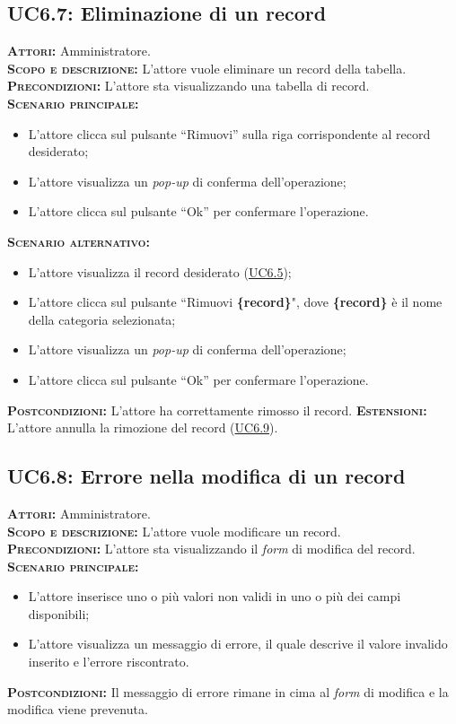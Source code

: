 \subsection{UC6.7: Eliminazione di un record}
\label{sec:UC67}
\textsc{\textbf{Attori:}} Amministratore.\\
\textsc{\textbf{Scopo e descrizione:}} L'attore vuole eliminare un record della tabella.\\
\textsc{\textsc{\textbf{Precondizioni:}}} L'attore sta visualizzando una tabella di record.\\
\textsc{\textbf{Scenario principale:}}
\begin{itemize}
    \item L'attore clicca sul pulsante ``Rimuovi'' sulla riga corrispondente al record desiderato;
    \item L'attore visualizza un \textit{pop-up} di conferma dell'operazione;
    \item L'attore clicca sul pulsante ``Ok'' per confermare l'operazione.
\end{itemize}
\textsc{\textbf{Scenario alternativo:}}
\begin{itemize}
    \item L'attore visualizza il record desiderato (\hyperref[sec:UC65]{UC6.5});
    \item L'attore clicca sul pulsante ``Rimuovi \textbf{\{record\}}", dove \textbf{\{record\}} è il nome della categoria selezionata;
    \item L'attore visualizza un \textit{pop-up} di conferma dell'operazione;
    \item L'attore clicca sul pulsante ``Ok'' per confermare l'operazione.
\end{itemize}
\textsc{\textbf{Postcondizioni:}} L'attore ha correttamente rimosso il record.
\textsc{\textbf{Estensioni:}} L'attore annulla la rimozione del record (\hyperref[sec:UC69]{UC6.9}).

\subsection{UC6.8: Errore nella modifica di un record}
\label{sec:UC68}
\textsc{\textbf{Attori:}} Amministratore.\\
\textsc{\textbf{Scopo e descrizione:}} L'attore vuole modificare un record.\\
\textsc{\textsc{\textbf{Precondizioni:}}} L'attore sta visualizzando il \textit{form} di modifica del record.\\
\textsc{\textbf{Scenario principale:}} 
\begin{itemize}
    \item L'attore inserisce uno o più valori non validi in uno o più dei campi disponibili;
    \item L'attore visualizza un messaggio di errore, il quale descrive il valore invalido inserito e l'errore riscontrato.
\end{itemize}
\textsc{\textbf{Postcondizioni:}} Il messaggio di errore rimane in cima al \textit{form} di modifica e la modifica viene prevenuta.

